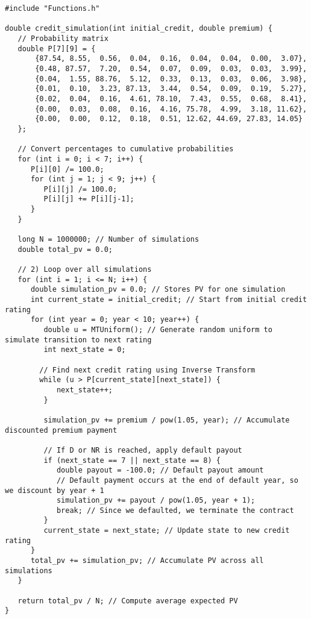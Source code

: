 \documentclass{report}
\begin{document}
\begin{lstlisting}
#include "Functions.h"

double credit_simulation(int initial_credit, double premium) {
   // Probability matrix
   double P[7][9] = {
       {87.54, 8.55,  0.56,  0.04,  0.16,  0.04,  0.04,  0.00,  3.07},  
       {0.48, 87.57,  7.20,  0.54,  0.07,  0.09,  0.03,  0.03,  3.99},  
       {0.04,  1.55, 88.76,  5.12,  0.33,  0.13,  0.03,  0.06,  3.98},  
       {0.01,  0.10,  3.23, 87.13,  3.44,  0.54,  0.09,  0.19,  5.27},  
       {0.02,  0.04,  0.16,  4.61, 78.10,  7.43,  0.55,  0.68,  8.41},  
       {0.00,  0.03,  0.08,  0.16,  4.16, 75.78,  4.99,  3.18, 11.62},  
       {0.00,  0.00,  0.12,  0.18,  0.51, 12.62, 44.69, 27.83, 14.05}
   };

   // Convert percentages to cumulative probabilities
   for (int i = 0; i < 7; i++) {
      P[i][0] /= 100.0;
      for (int j = 1; j < 9; j++) {
         P[i][j] /= 100.0;
         P[i][j] += P[i][j-1];
      }
   }

   long N = 1000000; // Number of simulations
   double total_pv = 0.0;

   // 2) Loop over all simulations
   for (int i = 1; i <= N; i++) {
      double simulation_pv = 0.0; // Stores PV for one simulation
      int current_state = initial_credit; // Start from initial credit rating
      for (int year = 0; year < 10; year++) {
         double u = MTUniform(); // Generate random uniform to simulate transition to next rating
         int next_state = 0; 

        // Find next credit rating using Inverse Transform
        while (u > P[current_state][next_state]) {
            next_state++;
         }

         simulation_pv += premium / pow(1.05, year); // Accumulate discounted premium payment

         // If D or NR is reached, apply default payout
         if (next_state == 7 || next_state == 8) {
            double payout = -100.0; // Default payout amount
            // Default payment occurs at the end of default year, so we discount by year + 1
            simulation_pv += payout / pow(1.05, year + 1); 
            break; // Since we defaulted, we terminate the contract
         }
         current_state = next_state; // Update state to new credit rating
      }
      total_pv += simulation_pv; // Accumulate PV across all simulations
   }

   return total_pv / N; // Compute average expected PV
}


\end{lstlisting}
\end{document}
